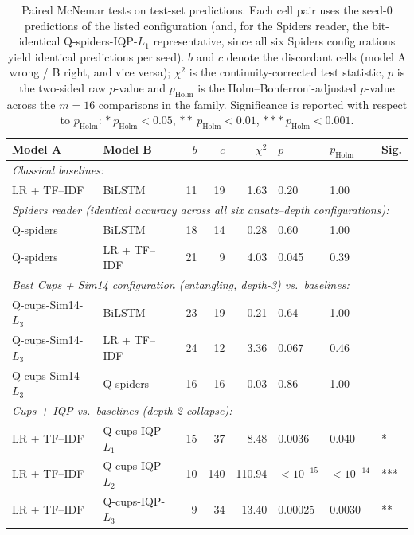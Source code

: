 \documentclass[11pt, a4paper]{article}
\begin{document}
\begin{table}[H]
\centering
\caption{Paired McNemar tests on test-set predictions. Each cell pair
uses the seed-0 predictions of the listed configuration (and, for the
Spiders reader, the bit-identical Q-spiders-IQP-\(L_1\) representative,
since all six Spiders configurations yield identical predictions per
seed). \(b\) and \(c\) denote the discordant cells (model A wrong /
B right, and vice versa); \(\chi^2\) is the continuity-corrected test
statistic, \(p\) is the two-sided raw \(p\)-value and \(p_{\text{Holm}}\)
is the Holm--Bonferroni-adjusted \(p\)-value across the \(m = 16\)
comparisons in the family. Significance is reported with respect to
\(p_{\text{Holm}}\): \(*\ p_{\text{Holm}}<0.05\),
\(**\ p_{\text{Holm}}<0.01\), \(***\ p_{\text{Holm}}<0.001\).}
\label{tab:mcnemar}
\footnotesize
\begin{tabular}{llrrrlll}
\toprule
Model A & Model B & \(b\) & \(c\) & \(\chi^2\) & \(p\) & \(p_{\text{Holm}}\) & Sig. \\
\midrule
\multicolumn{8}{l}{\emph{Classical baselines:}} \\
LR + TF--IDF & BiLSTM            & 11 & 19  & 1.63   & 0.20      & 1.00     &     \\
\multicolumn{8}{l}{\emph{Spiders reader (identical accuracy across all six ansatz--depth configurations):}} \\
Q-spiders    & BiLSTM            & 18 & 14  & 0.28   & 0.60      & 1.00     &     \\
Q-spiders    & LR + TF--IDF      & 21 & 9   & 4.03   & 0.045     & 0.39     &     \\
\multicolumn{8}{l}{\emph{Best Cups + Sim14 configuration (entangling, depth-3) vs.\ baselines:}} \\
Q-cups-Sim14-\(L_3\) & BiLSTM   & 23 & 19  & 0.21   & 0.64      & 1.00     &     \\
Q-cups-Sim14-\(L_3\) & LR + TF--IDF & 24 & 12 & 3.36 & 0.067     & 0.46     &     \\
Q-cups-Sim14-\(L_3\) & Q-spiders & 16 & 16  & 0.03   & 0.86      & 1.00     &     \\
\multicolumn{8}{l}{\emph{Cups + IQP vs.\ baselines (depth-2 collapse):}} \\
LR + TF--IDF & Q-cups-IQP-\(L_1\) & 15 & 37  & 8.48   & 0.0036    & 0.040    & *   \\
LR + TF--IDF & Q-cups-IQP-\(L_2\) & 10 & 140 & 110.94 & \(<10^{-15}\) & \(<10^{-14}\) & *** \\
LR + TF--IDF & Q-cups-IQP-\(L_3\) & 9  & 34  & 13.40  & 0.00025   & 0.0030   & **  \\

\end{tabular}
\end{table}
\end{document}
